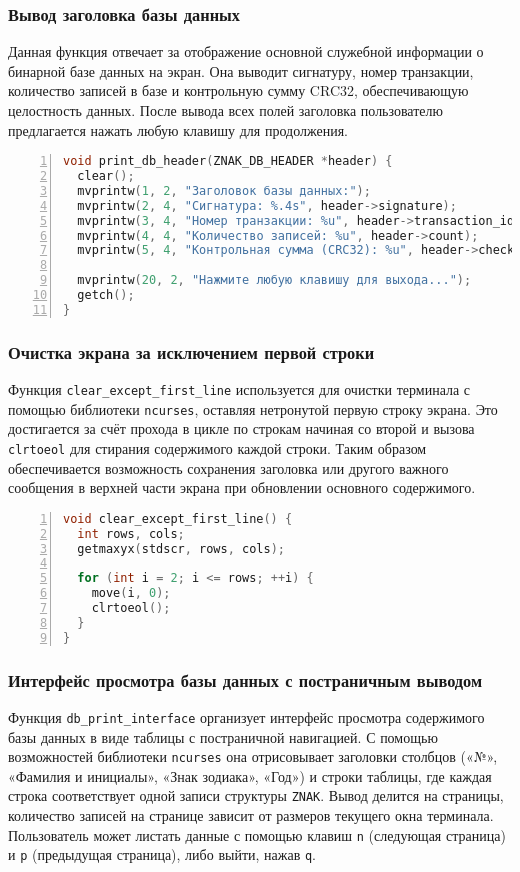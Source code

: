 \subsubsection*{Вывод заголовка базы данных}
Данная функция отвечает за отображение основной служебной информации о бинарной базе данных на экран. Она выводит сигнатуру, номер транзакции, количество записей в базе и контрольную сумму CRC32, обеспечивающую целостность данных. После вывода всех полей заголовка пользователю предлагается нажать любую клавишу для продолжения.

\begin{lstlisting}[language=C, caption=Функция print\_db\_header, numbers=left]
void print_db_header(ZNAK_DB_HEADER *header) {
  clear();
  mvprintw(1, 2, "Заголовок базы данных:");
  mvprintw(2, 4, "Сигнатура: %.4s", header->signature);
  mvprintw(3, 4, "Номер транзакции: %u", header->transaction_id);
  mvprintw(4, 4, "Количество записей: %u", header->count);
  mvprintw(5, 4, "Контрольная сумма (CRC32): %u", header->checksum);

  mvprintw(20, 2, "Нажмите любую клавишу для выхода...");
  getch();
}
\end{lstlisting}

\subsubsection*{Очистка экрана за исключением первой строки}
Функция \texttt{clear\_except\_first\_line} используется для очистки терминала с помощью библиотеки \texttt{ncurses}, оставляя нетронутой первую строку экрана. Это достигается за счёт прохода в цикле по строкам начиная со второй и вызова \texttt{clrtoeol} для стирания содержимого каждой строки. Таким образом обеспечивается возможность сохранения заголовка или другого важного сообщения в верхней части экрана при обновлении основного содержимого.

\begin{lstlisting}[language=C, caption=Функция clear\_except\_first\_line, numbers=left]
void clear_except_first_line() {
  int rows, cols;
  getmaxyx(stdscr, rows, cols);

  for (int i = 2; i <= rows; ++i) {
    move(i, 0);
    clrtoeol();
  }
}
\end{lstlisting}

\subsubsection*{Интерфейс просмотра базы данных с постраничным выводом}
Функция \texttt{db\_print\_interface} организует интерфейс просмотра содержимого базы данных в виде таблицы с постраничной навигацией. С помощью возможностей библиотеки \texttt{ncurses} она отрисовывает заголовки столбцов («№», «Фамилия и инициалы», «Знак зодиака», «Год») и строки таблицы, где каждая строка соответствует одной записи структуры \texttt{ZNAK}. Вывод делится на страницы, количество записей на странице зависит от размеров текущего окна терминала. Пользователь может листать данные с помощью клавиш \texttt{n} (следующая страница) и \texttt{p} (предыдущая страница), либо выйти, нажав \texttt{q}.

